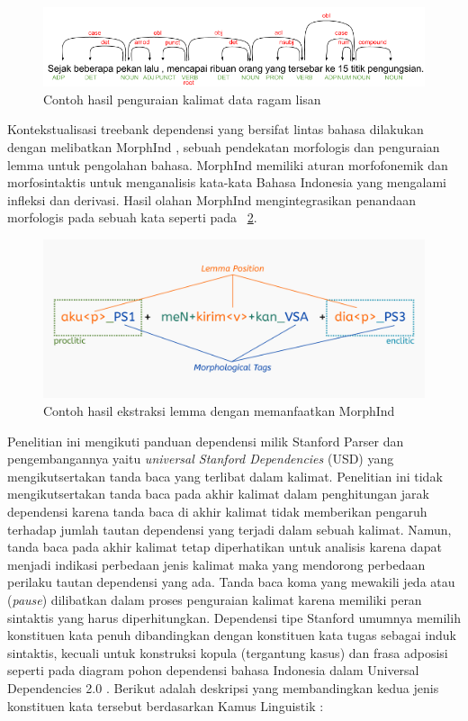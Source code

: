 \begin{figure}
	\centering \includegraphics[width=0.85
	\textwidth] {pics/contohlisan.png} \caption{Contoh hasil penguraian kalimat data ragam lisan} 
\label{fig:contohlisan} \end{figure}

Kontekstualisasi treebank dependensi yang bersifat lintas bahasa dilakukan dengan melibatkan MorphInd \citep{larasati2011indonesian}, sebuah pendekatan morfologis dan penguraian lemma untuk pengolahan bahasa. MorphInd memiliki aturan morfofonemik dan morfosintaktis untuk menganalisis kata-kata Bahasa Indonesia yang mengalami infleksi dan derivasi. Hasil olahan MorphInd mengintegrasikan penandaan morfologis pada sebuah kata seperti pada \pic~\ref{fig:morphind_schema}.

\begin{figure}
	\centering \includegraphics[width=1
	\textwidth] {pics/morphind_schema.png} \caption{Contoh hasil ekstraksi lemma dengan memanfaatkan MorphInd \citep{larasati2011indonesian} } 
\label{fig:morphind_schema} 
\end{figure}

Penelitian ini mengikuti panduan dependensi milik Stanford Parser \citep{de2008stanford} dan pengembangannya yaitu \textit{universal Stanford Dependencies} (USD) \citep{de2014universal} yang mengikutsertakan tanda baca yang terlibat dalam kalimat. Penelitian ini tidak mengikutsertakan tanda baca pada akhir kalimat dalam penghitungan jarak dependensi karena tanda baca di akhir kalimat tidak memberikan pengaruh terhadap jumlah tautan dependensi yang terjadi dalam sebuah kalimat. Namun, tanda baca pada akhir kalimat tetap diperhatikan untuk analisis karena dapat menjadi indikasi perbedaan jenis kalimat maka yang mendorong perbedaan perilaku tautan dependensi yang ada. Tanda baca koma yang mewakili jeda atau (\textit{pause}) dilibatkan dalam proses penguraian kalimat karena memiliki peran sintaktis yang harus diperhitungkan. Dependensi tipe Stanford \citep{de2008stanford} umumnya memilih konstituen kata penuh dibandingkan dengan konstituen kata tugas sebagai induk sintaktis, kecuali untuk konstruksi kopula (tergantung kasus) dan frasa adposisi seperti pada diagram pohon dependensi bahasa Indonesia dalam Universal Dependencies 2.0 \citep{nivre2017universal}. Berikut adalah deskripsi yang membandingkan kedua jenis konstituen kata tersebut berdasarkan Kamus Linguistik \citep{kridalaksana2008kamus}:

